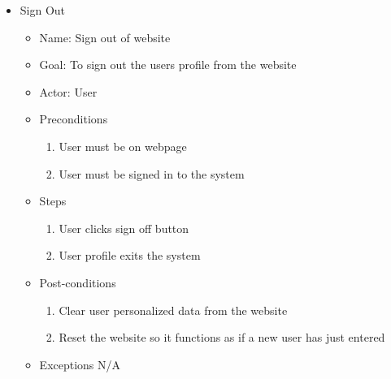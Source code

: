 \begin{itemize}
\item Sign Out
	\begin{itemize}
	\item Name: Sign out of website
    \item Goal: To sign out the users profile from the website
    \item Actor: User
    \item Preconditions
		\begin{enumerate}
		\item User must be on webpage
        \item User must be signed in to the system
        \end{enumerate}
    \item Steps
    	\begin{enumerate}
		\item User clicks sign off button
        \item User profile exits the system
        \end{enumerate}
    \item Post-conditions
    	\begin{enumerate}
		\item Clear user personalized data from the website
        \item Reset the website so it functions as if a new user has just entered 
        \end{enumerate}
    \item Exceptions N/A
    \end{itemize}
    
\end{itemize}